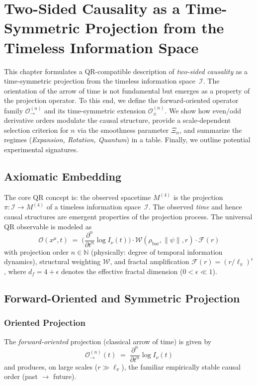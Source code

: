 \chapter{Two-Sided Causality as a Time-Symmetric Projection from the Timeless Information Space}

\begin{qrabstract}
This chapter formulates a QR-compatible description of \emph{two-sided causality}
as a time-symmetric projection from the timeless information space~$\mathcal{I}$.
The orientation of the arrow of time is not fundamental but emerges as a property
of the projection operator. To this end, we define the forward-oriented
operator family $\mathcal{O}^{(n)}_{\rightarrow}$ and its time-symmetric
extension $\mathcal{O}^{(n)}_{\pm}$. We show how even/odd derivative orders
modulate the causal structure, provide a scale-dependent selection criterion for $n$
via the smoothness parameter $\Xi_n$, and summarize the regimes (\emph{Expansion, Rotation,
Quantum}) in a table. Finally, we outline potential experimental signatures.
\end{qrabstract}

\section{Axiomatic Embedding}
The core QR concept is: the observed spacetime $M^{(4)}$ is the projection
\(\pi:\mathcal{I}\to M^{(4)}\) of a timeless information space~\(\mathcal{I}\).
The observed \emph{time} and hence causal structures are emergent properties
of the projection process. The universal QR observable is modeled as
\begin{equation}
\label{eq:qr-core}
\mathcal{O}(x^\mu,t)\;=\;\biggl(\frac{\partial^{n}}{\partial t^{n}}\log I_\nu(t)\biggr)\cdot
\mathcal{W}(\rho_{\mathrm{bar}},\|\psi\|,r)\cdot \mathcal{F}(r)
\end{equation}
with projection order \(n\in\mathbb{N}\) (physically: degree of temporal
information dynamics), structural weighting \(\mathcal{W}\), and fractal amplification
\(\mathcal{F}(r)=(r/\ell_\pi)^{\epsilon}\), where \(d_f=4+\epsilon\) denotes the effective fractal dimension
(\(0<\epsilon\ll1\)).

\section{Forward-Oriented and Symmetric Projection}
\subsection{Oriented Projection}
The \emph{forward-oriented} projection (classical arrow of time) is given by
\begin{equation}
\label{eq:forward}
\mathcal{O}^{(n)}_{\rightarrow}(t)\;=\;\frac{\partial^{n}}{\partial t^{n}}\log I_\nu(t)
\end{equation}
and produces, on large scales (\(r\gg \ell_\pi\)), the familiar empirically stable
causal order (past \(\to\) future).

